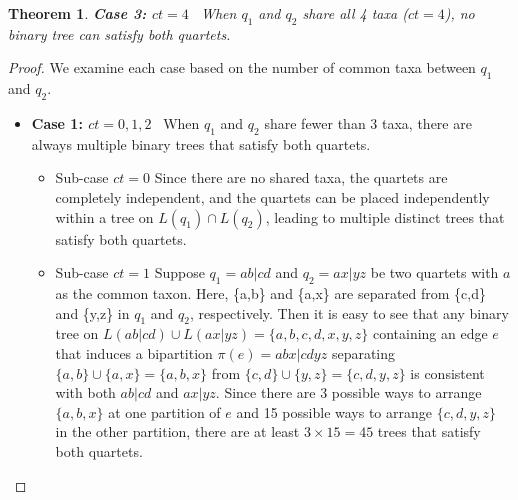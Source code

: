 \documentclass[10pt,a4paper]{article}
\newcommand{\add}[1]{{\color{blue} #1}}
\newtheorem{theorem}{Theorem}[section]
\begin{document}
\begin{appendices}
\begin{theorem}
\textbf{Case 3: $ct = 4$} \ When $q_1$ and $q_2$ share all 4 taxa ($ct = 4$), no binary tree can satisfy both quartets. %
\end{theorem}

\begin{proof}


We examine each case based on the number of common taxa between $q_1$ and $q_2$. %


\begin{itemize}
    \item \textbf{Case 1: $ct = 0, 1, 2$} \ When $q_1$ and $q_2$ share fewer than 3 taxa, there are always multiple binary trees that satisfy both quartets.



\begin{itemize}
    \item Sub-case $ct = 0$  Since there are no shared taxa, the quartets are completely independent, and the quartets can be placed independently within a tree on $L(q_1) \cap L(q_2)$, leading to multiple distinct trees that satisfy both quartets.

    \item Sub-case $ct = 1$ Suppose $q_1 = ab|cd$ and $q_2 = ax|yz$ be two quartets with $a$ as the common taxon. Here, \{a,b\} and \{a,x\} are separated from \{c,d\} and \{y,z\} in $q_1$ and $q_2$, respectively. Then it is easy to see that any binary tree on $L(ab|cd) \cup L(ax|yz) = \{a,b,c,d,x,y,z\}$ containing an edge $e$ that induces a bipartition $\pi(e) = abx|cdyz$ separating $\{a,b\} \cup \{a,x\} = \{a,b,x\}$ from $\{c,d\} \cup \{y,z\} = \{c,d,y,z\}$ is consistent with both $ab|cd$ and $ax|yz$. Since there are 3 possible ways to arrange $\{a,b,x\}$ at one partition of $e$ and 15 possible ways to arrange $\{c,d,y,z\}$ in the other partition, there are at least $3 \times 15 = 45$ trees that satisfy both quartets.


\end{itemize}
\end{itemize}
\end{proof}
\end{appendices}
\end{document}
